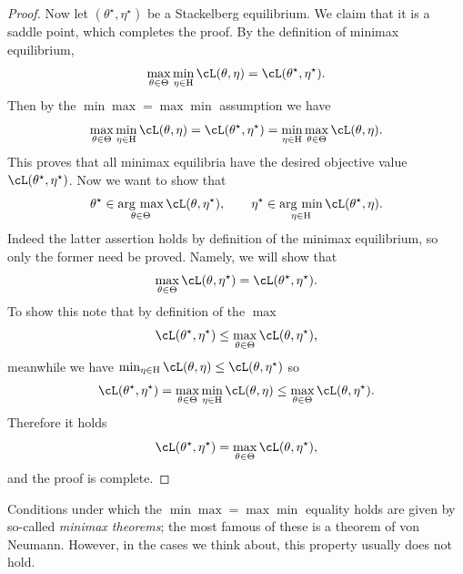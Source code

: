 \documentclass[../../book-main.tex]{subfiles}
\begin{document}
\begin{proof}
    Now let \((\theta^{\star}, \eta^{\star})\) be a Stackelberg equilibrium. We claim that it is a saddle point, which completes the proof. By the definition of minimax equilibrium,
    \begin{equation}
        \max_{\theta \in \Theta}\min_{\eta \in \Eta}\cL(\theta, \eta) = \cL(\theta^{\star}, \eta^{\star}).
    \end{equation}
    Then by the \(\min\max = \max\min\) assumption we have
    \begin{equation}
        \max_{\theta \in \Theta}\min_{\eta \in \Eta}\cL(\theta, \eta) = \cL(\theta^{\star}, \eta^{\star}) = \min_{\eta \in \Eta}\max_{\theta \in \Theta}\cL(\theta, \eta).
    \end{equation}
    This proves that all minimax equilibria have the desired objective value \(\cL(\theta^{\star}, \eta^{\star})\). Now we want to show that
    \begin{equation}
        \theta^{\star} \in \argmax_{\theta \in \Theta}\cL(\theta, \eta^{\star}), \qquad \eta^{\star} \in \argmin_{\eta \in \Eta}\cL(\theta^{\star}, \eta).
    \end{equation}
    Indeed the latter assertion holds by definition of the minimax equilibrium, so only the former need be proved. Namely, we will show that
    \begin{equation}
        \max_{\theta \in \Theta}\cL(\theta, \eta^{\star}) = \cL(\theta^{\star}, \eta^{\star}).
    \end{equation}
    To show this note that by definition of the \(\max\)
    \begin{equation}
        \cL(\theta^{\star}, \eta^{\star}) \leq \max_{\theta \in \Theta}\cL(\theta, \eta^{\star}),
    \end{equation}
    meanwhile we have \(\min_{\eta \in \Eta}\cL(\theta, \eta) \leq \cL(\theta, \eta^{\star})\) so
    \begin{equation}
        \cL(\theta^{\star}, \eta^{\star}) = \max_{\theta \in \Theta}\min_{\eta \in \Eta}\cL(\theta, \eta) \leq \max_{\theta \in \Theta}\cL(\theta, \eta^{\star}).
    \end{equation}
    Therefore it holds 
    \begin{equation}
        \cL(\theta^{\star}, \eta^{\star}) = \max_{\theta \in \Theta}\cL(\theta, \eta^{\star}),
    \end{equation}
    and the proof is complete.
\end{proof}
Conditions under which the \(\min\max = \max\min\) equality holds are given by so-called \textit{minimax theorems}; the most famous of these is a theorem of von Neumann. However, in the cases we think about, this property usually does not hold.
\end{document}
